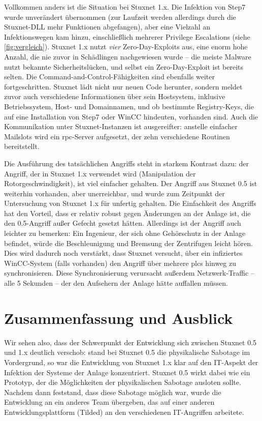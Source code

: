 \documentclass[a4paper]{article}
\begin{document}
Vollkommen anders ist die Situation bei Stuxnet 1.x.
Die Infektion von Step7 wurde unverändert übernommen (zur Laufzeit werden allerdings durch die Stuxnet-DLL mehr Funktionen abgefangen),
aber eine Vielzahl an Infektionswegen kam hinzu, einschließlich mehrerer Privilege Escalations (siehe \autoref{fig:vergleich}).
Stuxnet 1.x nutzt \emph{vier} Zero-Day-Exploits aus, eine enorm hohe Anzahl, die nie zuvor in Schädlingen nachgewiesen wurde –
die meiste Malware nutzt bekannte Sicherheitslücken, und selbst ein Zero-Day-Exploit ist bereits selten.
Die Command-and-Control-Fähigkeiten sind ebenfalls weiter fortgeschritten.
Stuxnet lädt nicht nur neuen Code herunter, sondern meldet zuvor auch verschiedene Informationen über sein Hostsystem,
inklusive Betriebssystem, Host- und Domainnamen, und ob bestimmte Registry-Keys, die auf eine Installation von Step7 oder WinCC hindeuten, vorhanden sind.
Auch die Kommunikation unter Stuxnet-Instanzen ist ausgereifter:
anstelle einfacher Mailslots wird ein \gls{rpc}-Server aufgesetzt, der zehn verschiedene Routinen bereitstellt. %

Die Ausführung des tatsächlichen Angriffs steht in starkem Kontrast dazu:
der Angriff, der in Stuxnet 1.x verwendet wird (Manipulation der Rotorgeschwindigkeit),
ist viel einfacher gehalten.
Der Angriff aus Stuxnet 0.5 ist weiterhin vorhanden, aber unerreichbar, und wurde zum Zeitpunkt der Untersuchung von Stuxnet 1.x für unfertig gehalten\cite{dossier}.
Die Einfachkeit des Angriffs hat den Vorteil, dass er relativ robust gegen Änderungen an der Anlage ist, die den 0.5-Angriff außer Gefecht gesetzt hätten.
Allerdings ist der Angriff auch leichter zu bemerken:
Ein Ingenieur, der sich ohne Gehörschutz in der Anlage befindet, würde die Beschleunigung und Bremsung der Zentrifugen leicht hören.
Dies wird dadurch noch verstärkt, dass Stuxnet versucht, über ein infiziertes WinCC-System (falls vorhanden) den Angriff über mehrere \glspl{plc} hinweg zu synchronisieren.
Diese Synchronisierung verursacht außerdem Netzwerk-Traffic – alle 5 Sekunden – der den Aufsehern der Anlage hätte auffallen müssen.

\section{Zusammenfassung und Ausblick}

Wir sehen also, dass der Schwerpunkt der Entwicklung sich zwischen Stuxnet 0.5 und 1.x deutlich verschob:
stand bei Stuxnet 0.5 die physikalische Sabotage im Vordergrund, so war die Entwicklung von Stuxnet 1.x klar auf den IT-Aspekt der Infektion der Systeme der Anlage konzentriert.
Stuxnet 0.5 wirkt dabei wie ein Prototyp, der die Möglichkeiten der physikalischen Sabotage ausloten sollte.
Nachdem dann feststand, dass diese Sabotage möglich war, wurde die Entwicklung an ein anderes Team übergeben,
das auf einer anderen Entwicklungsplattform (Tilded\cite{05}) an den verschiedenen IT-Angriffen arbeitete.
\end{document}
